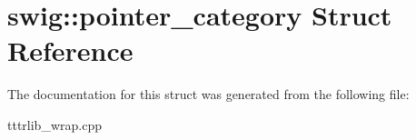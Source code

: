 \hypertarget{structswig_1_1pointer__category}{}\section{swig\+:\+:pointer\+\_\+category Struct Reference}
\label{structswig_1_1pointer__category}


The documentation for this struct was generated from the following file\+:\begin{DoxyCompactItemize}
\item 
tttrlib\+\_\+wrap.\+cpp\end{DoxyCompactItemize}
